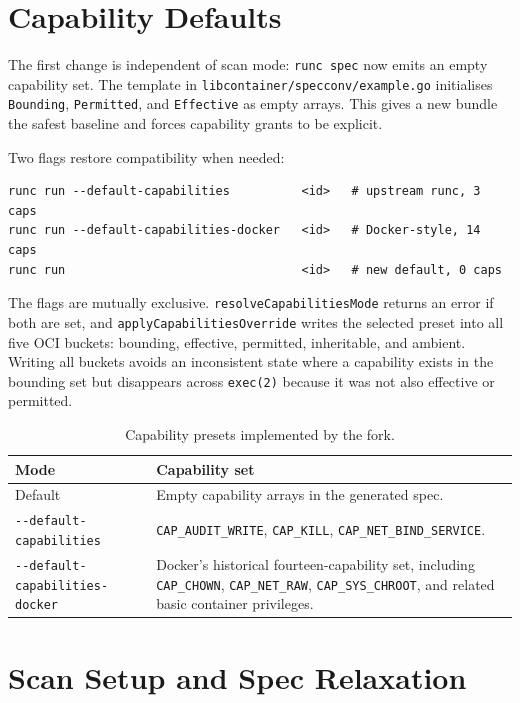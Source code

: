 \section{Capability Defaults}\label{sec:impl-caps}

The first change is independent of scan mode: \texttt{runc spec} now emits an empty capability set. The template in \texttt{libcontainer/specconv/example.go} initialises \texttt{Bounding}, \texttt{Permitted}, and \texttt{Effective} as empty arrays. This gives a new bundle the safest baseline and forces capability grants to be explicit.

Two flags restore compatibility when needed:

\begin{verbatim}
runc run --default-capabilities          <id>   # upstream runc, 3 caps
runc run --default-capabilities-docker   <id>   # Docker-style, 14 caps
runc run                                 <id>   # new default, 0 caps
\end{verbatim}

The flags are mutually exclusive. \texttt{resolveCapabilitiesMode} returns an error if both are set, and \texttt{applyCapabilitiesOverride} writes the selected preset into all five OCI buckets: bounding, effective, permitted, inheritable, and ambient. Writing all buckets avoids an inconsistent state where a capability exists in the bounding set but disappears across \texttt{exec(2)} because it was not also effective or permitted.

\begin{table}[ht]
\centering
\caption{Capability presets implemented by the fork.}
\label{tab:impl-cap-presets}
\begin{tabular}{p{4.0cm}p{10.0cm}}
\toprule
\textbf{Mode} & \textbf{Capability set} \\
\midrule
Default & Empty capability arrays in the generated spec. \\
\texttt{-{}-default-capabilities} & \texttt{CAP\_AUDIT\_WRITE}, \texttt{CAP\_KILL}, \texttt{CAP\_NET\_BIND\_SERVICE}. \\
\texttt{-{}-default-capabilities-docker} & Docker's historical fourteen-capability set, including \texttt{CAP\_CHOWN}, \texttt{CAP\_NET\_RAW}, \texttt{CAP\_SYS\_CHROOT}, and related basic container privileges. \\
\bottomrule
\end{tabular}
\end{table}

\section{Scan Setup and Spec Relaxation}\label{sec:impl-scan-setup}

